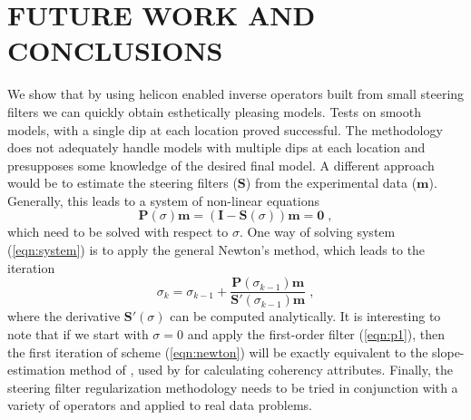 \section{FUTURE WORK AND CONCLUSIONS}
We show that by using helicon enabled inverse 
operators built from small steering filters we can quickly obtain esthetically
pleasing models.
Tests on smooth models, with a single dip at each location proved 
successful.  The methodology does not adequately handle models with
multiple dips at each location and presupposes some knowledge of the
desired final model. 
A different approach would be to estimate
the steering filters ($\mathbf S$) from the experimental data ($\mathbf m$). 
Generally, this leads to a
system of non-linear equations
\begin{equation}
  \label{eqn:system}
  \mathbf{P}(\sigma) \mathbf{m} =
  (\mathbf{I} - \mathbf{S}(\sigma)) \mathbf{m} = \mathbf{0}\;,
\end{equation}
which need to be solved with respect to $\sigma$. One way of solving
system (\ref{eqn:system}) is to apply the general Newton's method,
which leads to the iteration
\begin{equation}
  \label{eqn:newton}
  \sigma_{k} = \sigma_{k-1} + \frac{\mathbf{P}(\sigma_{k-1})
    \mathbf{m}}{\mathbf{S}'(\sigma_{k-1}) \mathbf{m}}\;,
\end{equation}
where the derivative $\mathbf{S}'(\sigma)$ can be computed analytically.
It is interesting to note that if we start with $\sigma =0$ and apply
the first-order filter (\ref{eqn:p1}), then the first iteration of
scheme (\ref{eqn:newton}) will be exactly equivalent to the
slope-estimation method of \cite{Claerbout.blackwell.92}, used by
\cite{Bednar.sep.95.bednarb} for calculating coherency attributes.
Finally, the steering filter
regularization methodology needs to be tried in
conjunction with a variety of operators and 
applied to  real data problems.








